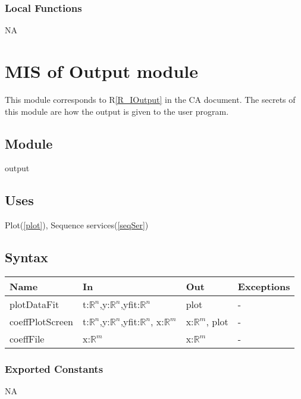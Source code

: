 \documentclass[12pt, titlepage]{article}
\begin{document}
\subsubsection{Local Functions}

NA


\section{MIS of Output module} \label{mOutput}

This module corresponds to R\ref{R_IOutput} in the CA document. The secrets of 
this module are how the output is given to the user program.

\subsection{Module}

output

\subsection{Uses}

Plot(\ref{plot}), Sequence services(\ref{seqSer})

\subsection{Syntax}

\begin{tabular}{p{3cm} p{3cm} p{4cm} >{\raggedright\arraybackslash}p{5cm}}
	\toprule
	\textbf{Name} & \textbf{In} & \textbf{Out} & \textbf{Exceptions} \\
	\midrule
	
	plotDataFit & t:$\mathbb{R}^n$,y:$\mathbb{R}^n$,yfit:$\mathbb{R}^n$ & plot 
	& -  
	\\
	
	coeffPlotScreen & t:$\mathbb{R}^n$,y:$\mathbb{R}^n$,yfit:$\mathbb{R}^n$, 
	x:$\mathbb{R}^m$ & 
	x:$\mathbb{R}^m$, plot &  -\\
	
	coeffFile& x:$\mathbb{R}^m$ & 
	x:$\mathbb{R}^m$ & - \\
	
	\bottomrule
\end{tabular}


\subsubsection{Exported Constants}
NA
\end{document}

